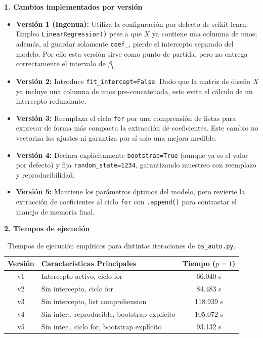 \documentclass[12pt, letterpaper]{article}
\begin{document}
\textbf{1. Cambios implementados por versión}
\begin{itemize}
    \item \textbf{Versión 1 (Ingenua):} Utiliza la configuración por defecto de scikit-learn. Emplea \texttt{LinearRegression()} pese a que $X$ ya contiene una columna de unos; además, al guardar solamente \texttt{coef\_}, pierde el intercepto separado del modelo. Por ello esta versión sirve como punto de partida, pero no entrega correctamente el intervalo de $\beta_0$.
    \item \textbf{Versión 2:} Introduce \texttt{fit\_intercept=False}. Dado que la matriz de diseño $X$ ya incluye una columna de unos pre-concatenada, esto evita el cálculo de un intercepto redundante.
    \item \textbf{Versión 3:} Reemplaza el ciclo \texttt{for} por una comprensión de listas para expresar de forma más compacta la extracción de coeficientes. Este cambio no vectoriza los ajustes ni garantiza por sí solo una mejora medible.
    \item \textbf{Versión 4:} Declara explícitamente \texttt{bootstrap=True} (aunque ya es el valor por defecto) y fija \texttt{random\_state=1234}, garantizando muestreo con reemplazo y reproducibilidad.
    \item \textbf{Versión 5:} Mantiene los parámetros óptimos del modelo, pero revierte la extracción de coeficientes al ciclo \texttt{for} con \texttt{.append()} para contrastar el manejo de memoria final.
\end{itemize}

\textbf{2. Tiempos de ejecución}

\begin{table}[h]
    \centering
    \begin{tabular}{|c|l|c|}
    \hline
    \textbf{Versión} & \textbf{Características Principales} & \textbf{Tiempo ($p=1$)} \\
    \hline
    v1 & Intercepto activo, ciclo for & 66.040 s \\
    v2 & Sin intercepto, ciclo for & 84.483 s \\
    v3 & Sin intercepto, list comprehension & 118.939 s \\
    v4 & Sin inter., reproducible, bootstrap explícito & 105.072 s \\
    v5 & Sin inter., ciclo for, bootstrap explícito & 93.132 s \\
    \hline
    \end{tabular}
    \caption{Tiempos de ejecución empíricos para distintas iteraciones de \texttt{bs\_auto.py}.}
\end{table}
\end{document}

